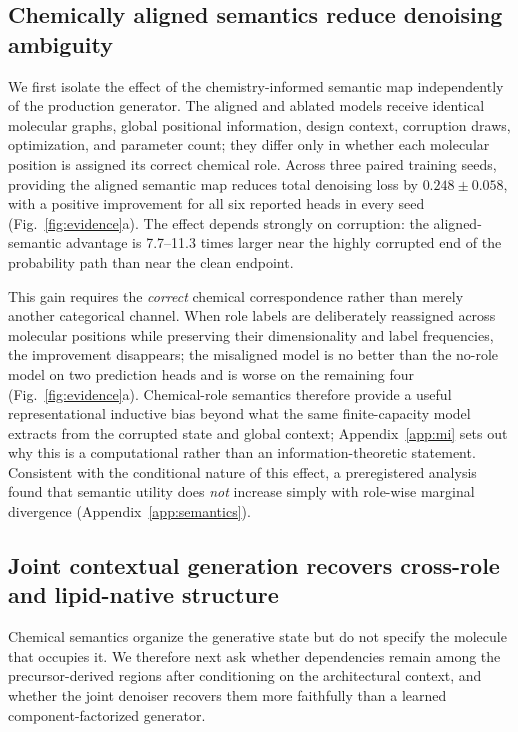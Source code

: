 \documentclass{article}
\newcounter{none}
\newcommand{\SemGapMag}{0.248}                %
\newcommand{\SemGapSD}{0.058}                 %
\newcommand{\SemSeeds}{three}                 %
\newcommand{\SemHeads}{six}                   %
\newcommand{\CorruptLow}{7.7}                 %
\newcommand{\CorruptHigh}{11.3}               %
\begin{document}
\subsection{Chemically aligned semantics reduce denoising ambiguity}
\label{sec:res-semantics}
We first isolate the effect of the chemistry-informed semantic map independently of the production
generator. The aligned and ablated models receive identical molecular graphs, global positional
information, design context, corruption draws, optimization, and parameter count; they differ only in
whether each molecular position is assigned its correct chemical role. Across \SemSeeds{} paired
training seeds, providing the aligned semantic map reduces total denoising loss by
$\SemGapMag \pm \SemGapSD$, with a positive improvement for all \SemHeads{}
reported heads in every seed (Fig.~\ref{fig:evidence}a). The effect depends strongly on corruption:
the aligned-semantic advantage is \CorruptLow{}--\CorruptHigh{} times larger near the highly
corrupted end of the probability path than near the clean endpoint.

This gain requires the \emph{correct} chemical correspondence rather than merely another categorical
channel. When role labels are deliberately reassigned across molecular positions while preserving
their dimensionality and label frequencies, the improvement disappears; the misaligned model is no
better than the no-role model on two prediction heads and is worse on the remaining four
(Fig.~\ref{fig:evidence}a). Chemical-role semantics therefore provide a useful representational inductive bias
beyond what the same finite-capacity model extracts from the corrupted state and global context;
Appendix~\ref{app:mi} sets out why this is a computational rather than an information-theoretic
statement. Consistent
with the conditional nature of this effect, a preregistered analysis found that semantic utility does
\emph{not} increase simply with role-wise marginal divergence (Appendix~\ref{app:semantics}).

\subsection{Joint contextual generation recovers cross-role and lipid-native structure}
\label{sec:res-fidelity}
Chemical semantics organize the generative state but do not specify the molecule that occupies it. We
therefore next ask whether dependencies remain among the precursor-derived regions after conditioning
on the architectural context, and whether the joint denoiser recovers them more faithfully than a
learned component-factorized generator.
\end{document}
